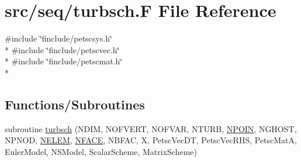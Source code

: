 \hypertarget{seq_2turbsch_8_f}{\section{src/seq/turbsch.F File Reference}
\label{seq_2turbsch_8_f}
}
{\ttfamily \#include \char`\"{}finclude/petscsys.\-h\char`\"{}}\\*
{\ttfamily \#include \char`\"{}finclude/petscvec.\-h\char`\"{}}\\*
{\ttfamily \#include \char`\"{}finclude/petscmat.\-h\char`\"{}}\\*
\subsection*{Functions/\-Subroutines}
\begin{DoxyCompactItemize}
\item 
subroutine \hyperlink{seq_2turbsch_8_f_a27a8ba455a41d3ab34390fdecf755152}{turbsch} (N\-D\-I\-M, N\-O\-F\-V\-E\-R\-T, N\-O\-F\-V\-A\-R, N\-T\-U\-R\-B, \hyperlink{mesh_8com_ae28c1572321efcd8715b974d87d20c58}{N\-P\-O\-I\-N}, N\-G\-H\-O\-S\-T, N\-P\-N\-O\-D, \hyperlink{mesh_8com_aee5e75b79d0e815c0603cfbccc618957}{N\-E\-L\-E\-M}, \hyperlink{mesh_8com_a78142d59d4cbb9fedbede16187658dd3}{N\-F\-A\-C\-E}, N\-B\-F\-A\-C, X, Petsc\-Vec\-D\-T, Petsc\-Vec\-R\-H\-S, Petsc\-Mat\-A, Euler\-Model, N\-S\-Model, Scalar\-Scheme, Matrix\-Scheme)
\end{DoxyCompactItemize}



